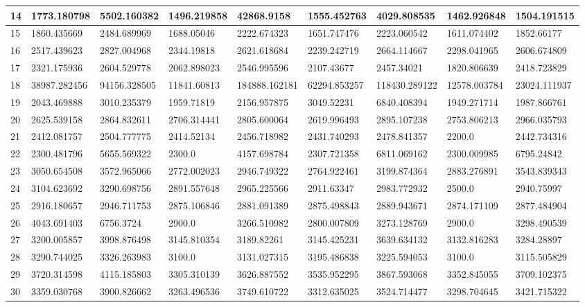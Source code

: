 \begin{table*}[t]
\begin{tabular}{|p{0.8cm}|p{1.6cm}|p{1.6cm}|p{1.6cm}|p{1.6cm}|p{1.6cm}|p{1.6cm}|p{1.6cm}|p{1.6cm}|}
 \hline
14  & 1773.180798 & 5502.160382 & 1496.219858 & 42868.9158 & 1555.452763 & 4029.808535 & 1462.926848 & 1504.191515 \\ 
 \hline
15  & 1860.435669 & 2484.689969 & 1688.05046 & 2222.674323 & 1651.747476 & 2223.060542 & 1611.074402 & 1852.66177 \\ 
 \hline
16  & 2517.439623 & 2827.004968 & 2344.19818 & 2621.618684 & 2239.242719 & 2664.114667 & 2298.041965 & 2606.674809 \\ 
 \hline
17  & 2321.175936 & 2604.529778 & 2062.898023 & 2546.995596 & 2107.43677 & 2457.34021 & 1820.806639 & 2418.723829 \\ 
 \hline
18  & 38987.282456 & 94156.328505 & 11841.60813 & 184888.162181 & 62294.853257 & 118430.289122 & 12578.003784 & 23024.111937 \\ 
 \hline
19  & 2043.469888 & 3010.235379 & 1959.71819 & 2156.957875 & 3049.52231 & 6840.408394 & 1949.271714 & 1987.866761 \\ 
 \hline
20  & 2625.539158 & 2864.832611 & 2706.314441 & 2805.600064 & 2619.996493 & 2895.107238 & 2753.806213 & 2966.035793 \\ 
 \hline
21  & 2412.081757 & 2504.777775 & 2414.52134 & 2456.718982 & 2431.740293 & 2478.841357 & 2200.0 & 2442.734316 \\ 
 \hline
22  & 2300.481796 & 5655.569322 & 2300.0 & 4157.698784 & 2307.721358 & 6811.069162 & 2300.009985 & 6795.24842 \\ 
 \hline
23  & 3050.654508 & 3572.965066 & 2772.002023 & 2946.749322 & 2764.922461 & 3199.874364 & 2883.276891 & 3543.839343 \\ 
 \hline
24  & 3104.623692 & 3290.698756 & 2891.557648 & 2965.225566 & 2911.63347 & 2983.772932 & 2500.0 & 2940.75997 \\ 
 \hline
25  & 2916.180657 & 2946.711753 & 2875.106846 & 2881.091389 & 2875.498843 & 2889.943671 & 2874.171109 & 2877.484904 \\ 
 \hline
26  & 4043.691403 & 6756.3724 & 2900.0 & 3266.510982 & 2800.007809 & 3273.128769 & 2900.0 & 3298.490539 \\ 
 \hline
27  & 3200.005857 & 3998.876498 & 3145.810354 & 3189.82261 & 3145.425231 & 3639.634132 & 3132.816283 & 3284.28897 \\ 
 \hline
28  & 3290.744025 & 3326.263983 & 3100.0 & 3131.027315 & 3195.486838 & 3225.594053 & 3100.0 & 3115.505829 \\ 
 \hline
29  & 3720.314598 & 4115.185803 & 3305.310139 & 3626.887552 & 3535.952295 & 3867.593068 & 3352.845055 & 3709.102375 \\ 
 \hline
30  & 3359.030768 & 3900.826662 & 3263.496536 & 3749.610722 & 3312.635025 & 3524.714477 & 3298.704645 & 3421.715322 \\ 
 \hline


 \end{tabular}
\end{table*}


